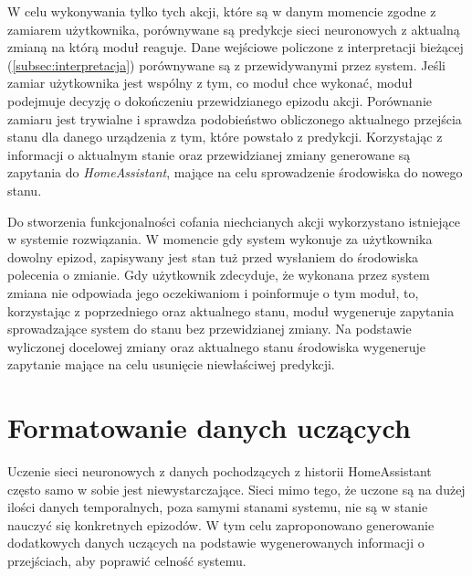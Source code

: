 W celu wykonywania tylko tych akcji, które są w danym momencie zgodne z zamiarem użytkownika, porównywane są predykcje sieci neuronowych z aktualną zmianą na którą moduł reaguje. Dane wejściowe policzone z interpretacji bieżącej (\ref{subsec:interpretacja}) porównywane są z przewidywanymi przez system. Jeśli zamiar użytkownika jest wspólny z tym, co moduł chce wykonać, moduł podejmuje decyzję o dokończeniu przewidzianego epizodu akcji. Porównanie zamiaru jest trywialne i sprawdza podobieństwo obliczonego aktualnego przejścia stanu dla danego urządzenia z tym, które powstało z predykcji. Korzystając z informacji o aktualnym stanie oraz przewidzianej zmiany generowane są zapytania do \textit{HomeAssistant}, mające na celu sprowadzenie środowiska do nowego stanu.

Do stworzenia funkcjonalności cofania niechcianych akcji wykorzystano istniejące w systemie rozwiązania. W momencie gdy system wykonuje za użytkownika dowolny epizod, zapisywany jest stan tuż przed wysłaniem do środowiska polecenia o zmianie. Gdy użytkownik zdecyduje, że wykonana przez system zmiana nie odpowiada jego oczekiwaniom i poinformuje o tym moduł, to, korzystając z poprzedniego oraz aktualnego stanu, moduł wygeneruje zapytania sprowadzające system do stanu bez przewidzianej zmiany. Na podstawie wyliczonej docelowej zmiany oraz aktualnego stanu środowiska wygeneruje zapytanie mające na celu usunięcie niewłaściwej predykcji.

\section{Formatowanie danych uczących} \label{sec:dane_uczace}
Uczenie sieci neuronowych z danych pochodzących z historii HomeAssistant często samo w sobie jest niewystarczające. Sieci mimo tego, że uczone są na dużej ilości danych temporalnych, poza samymi stanami systemu, nie są w stanie nauczyć się konkretnych epizodów. W tym celu zaproponowano generowanie dodatkowych danych uczących na podstawie wygenerowanych informacji o przejściach, aby poprawić celność systemu.

